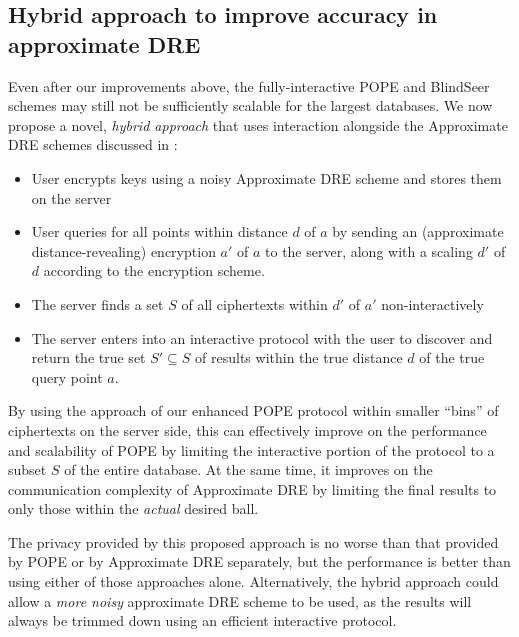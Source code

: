 
\subsection{Hybrid approach to improve accuracy in approximate DRE}

Even after our improvements above, the fully-interactive POPE and
BlindSeer schemes may still not be sufficiently scalable for the largest
databases. We now propose a novel,
\emph{hybrid approach} that uses interaction alongside the Approximate
DRE schemes discussed in :

\begin{itemize}\setlength{\itemsep}{0em}
  \item User encrypts keys using a noisy Approximate DRE scheme and
  stores them on the server
  \item User queries for all points within distance $d$ of $a$ by
    sending an (approximate distance-revealing) encryption $a'$ of $a$ to the
    server, along with a scaling $d'$ of $d$ according to
    the encryption scheme.
  \item The server finds a set $S$ of all ciphertexts within $d'$ of $a'$
    non-interactively
  \item The server enters into an interactive protocol with the user to
    discover and return
    the true set $S' \subseteq S$ of results within the true
    distance $d$ of the true query point $a$.
\end{itemize}

By using the approach of our enhanced POPE protocol within smaller
``bins'' of ciphertexts on the server side, this can effectively
improve on the performance and scalability of POPE by limiting the
interactive portion of the protocol to a subset $S$ of the entire
database. At the same time, it improves on the communication complexity
of Approximate DRE by limiting the final results to only those within
the \emph{actual} desired ball.

The privacy provided by this proposed approach is no worse than that
provided by POPE or by Approximate DRE separately, but the performance
is better than using either of those approaches alone. Alternatively,
the hybrid approach could allow a \emph{more noisy} approximate DRE
scheme to be used, as the results will always be trimmed down using an
efficient interactive protocol.

